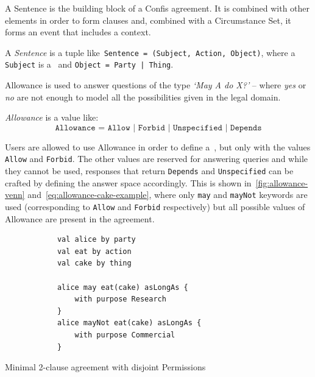 A Sentence is the building block of a Confis agreement.
It is combined with other elements in order to form clauses and, combined with a Circumstance Set, it forms an event that includes a context.

\begin{definition}[Sentence]
    \label{def:sentence}
    A \emph{Sentence} is a tuple like~\texttt{Sentence = (Subject, Action, Object)}, where a \texttt{Subject} is a~ and \texttt{Object = Party | Thing}.
\end{definition}

Allowance is used to answer questions of the type \emph{`May A do X?'} -- where \emph{yes} or \emph{no} are not enough to model all the possibilities given in the legal domain.


\begin{definition}[Allowance]
    \label{def:allowance}
    \emph{Allowance} is a value like:
    \[\texttt{Allowance = Allow | Forbid | Unspecified | Depends}\]
\end{definition}

Users are allowed to use Allowance in order to define a~, but only with the values \texttt{Allow} and \texttt{Forbid}.
The other values are reserved for answering queries and while they cannot be used, responses that return \texttt{Depends} and \texttt{Unspecified} can be crafted by defining the answer space accordingly.
This is shown in~\autoref{fig:allowance-venn} and~\autoref{eq:allowance-cake-example}, where only \texttt{may} and \texttt{mayNot} keywords are used (corresponding to \texttt{Allow} and \texttt{Forbid} respectively) but all possible values of Allowance are present in the agreement.

\begin{listing}[h]
    \centering
    \begin{minipage}{0.5\textwidth}
        \begin{verbatim}
            val alice by party
            val eat by action
            val cake by thing

            alice may eat(cake) asLongAs {
                with purpose Research
            }
            alice mayNot eat(cake) asLongAs {
                with purpose Commercial
            }
        \end{verbatim}
    \end{minipage}
    \caption{Minimal 2-clause agreement with disjoint Permissions}
    \label{list:disjoint-confis}

\end{listing}


